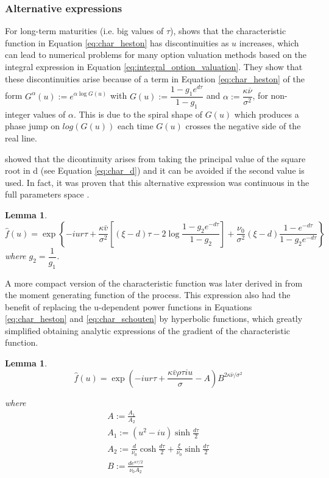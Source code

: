 \documentclass[12,twoside]{mammeTFM}
\newtheorem{lem}[thm]{Lemma}
\theoremstyle{definition}
\theoremstyle{remark}
\newcommand{\vega}{\nu}
\begin{document}
\subsubsection{Alternative expressions}

For long-term maturities (i.e. big values of $\tau$), \cite{kal06} shows that the characteristic function in Equation \ref{eq:char_heston} has discontinuities as $u$ increases, which can lead to numerical problems for many option valuation methods based on the integral expression in Equation \ref{eq:integral_option_valuation}. They show that these discontinuities arise because of a term in Equation \ref{eq:char_heston} of the form $G^\alpha(u) := e^{\alpha \log G(u)}$ with $G(u) := \dfrac{1 - g_1 e^{d\tau}}{1 - g_1}$ and $\alpha := \dfrac{\kappa \overline{\vega}}{\sigma^2}$, for non-integer values of $\alpha$. This is due to the spiral shape of $G(u)$ which produces a phase jump on $log(G(u))$ each time $G(u)$ crosses the negative side of the real line.

\cite{Albrecher2007} showed that the dicontinuity arises from taking the principal value of the square root in d (see Equation \ref{eq:char_d}) and it can be avoided if the second value is used. In fact, it was proven that this alternative expression was continuous in the full parameters space \cite{sch04}.

\begin{lem}
\begin{equation} \label{eq:char_schouten}
\hat{f}(u)=\exp \left\{-i u r \tau
+\frac{\kappa \bar{v}}{\sigma^{2}}\left[(\xi-d) \tau-2 \log \frac{1-g_{2} e^{-d \tau}}{1-g_{2}}\right]+\frac{\nu_{0}}{\sigma^{2}}(\xi-d) \frac{1-e^{-d \tau}}{1-g_{2} e^{-d \tau}}\right\} 
\end{equation}
where $g_2 = \dfrac{1}{g_1}$.
\end{lem}

A more compact version of the characteristic function was later derived in \cite{rol10} from the moment generating function of the process. This expression also had the benefit of replacing the u-dependent power functions in Equations \ref{eq:char_heston} and \ref{eq:char_schouten} by hyperbolic functions, which greatly simplified obtaining analytic expressions of the gradient of the characteristic function.

\begin{lem}
\begin{equation} \label{eq:char_del_bano}
\hat{f}(u)=\exp \left(-i u r \tau + \frac{\kappa \bar{v} \rho \tau i u}{\sigma}-A\right) B^{2 \kappa \bar{\nu} / \sigma^{2}}
\end{equation}

where
\begin{equation}\begin{array}{l}
A:=\frac{A_{1}}{A_{2}} \\
A_{1}:=\left(u^{2} - i u\right) \sinh \frac{d \tau}{2} \\
A_{2}:=\frac{d}{\nu_{0}} \cosh \frac{d \tau}{2}+\frac{\xi}{\nu_{0}} \sinh \frac{d \tau}{2} \\
B:=\frac{d e^{\kappa \tau / 2}}{\nu_{0} A_{2}}
\end{array}\end{equation}
\end{lem}
\end{document}
